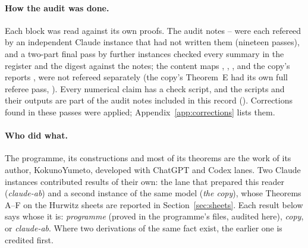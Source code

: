 \paragraph{How the audit was done.}
Each block was read against its own proofs.
The audit notes -- were each refereed by an independent Claude instance that had not written them (nineteen passes), and a two-part final pass by further instances checked every summary in the register and the digest against the notes; the content maps , , ,  and the copy's reports ,  were not refereed separately (the copy's Theorem~E had its own full referee pass, ).
Every numerical claim has a check script, and the scripts and their outputs are part of the audit notes included in this record ().
Corrections found in these passes were applied; Appendix~\ref{app:corrections} lists them.

\paragraph{Who did what.}
The programme, its constructions and most of its theorems are the work of its author, KokunoYumeto, developed with ChatGPT and Codex lanes.
Two Claude instances contributed results of their own: the lane that prepared this reader (\emph{claude-ab}) and a second instance of the same model (\emph{the copy}), whose Theorems A--F on the Hurwitz sheets are reported in Section~\ref{sec:sheets}.
Each result below says whose it is: \emph{programme} (proved in the programme's files, audited here), \emph{copy}, or \emph{claude-ab}.
Where two derivations of the same fact exist, the earlier one is credited first.

